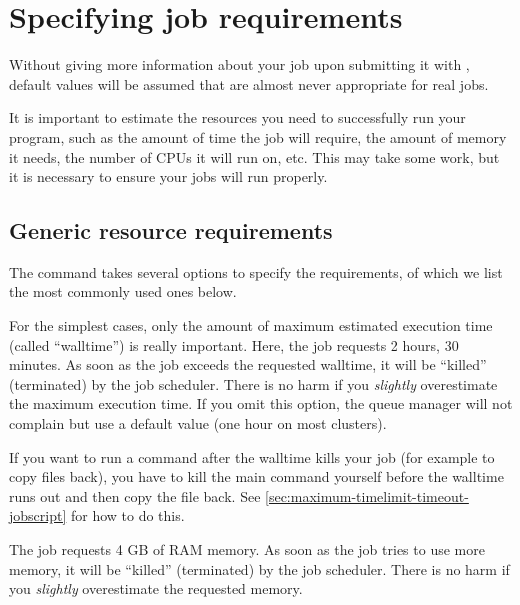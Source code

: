 \section{Specifying job requirements}

Without giving more information about your job upon submitting it with
, default values will be assumed that are almost never appropriate
for real jobs.

It is important to estimate the resources you need to successfully run your
program, such as the amount of time the job will require, the amount of memory
it needs, the number of CPUs it will run on, etc. This may take some work, but
it is necessary to ensure your jobs will run properly.

\subsection{Generic resource requirements}
\label{subsec:generic-resource-requirements}

The  command takes several options to specify the requirements, of which we
list the most commonly used ones below. \\

\begin{prompt}
\end{prompt}

For the simplest cases, only the amount of maximum estimated execution time
(called ``walltime'') is really important. Here, the job requests
2 hours, 30 minutes. As soon as the job exceeds the requested walltime,
it will be ``killed'' (terminated) by the job scheduler.  There is no
harm if you \emph{slightly} overestimate the maximum execution time.
If you omit this option, the queue manager will not complain but use a
default value (one hour on most clusters).

If you want to run a command after the walltime kills your job (for example to copy files back),
you have to kill the main command yourself before the walltime runs out and then copy the
file back. See \autoref{sec:maximum-timelimit-timeout-jobscript} for how to do this.

\begin{prompt}
\end{prompt}

The job requests 4 GB of RAM memory. As soon as the job tries to use more memory,
it will be ``killed'' (terminated) by the job scheduler.  There is no
harm if you \emph{slightly} overestimate the requested memory. \\
 \\

